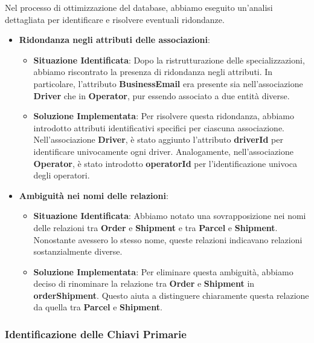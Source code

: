 Nel processo di ottimizzazione del database, abbiamo eseguito un'analisi dettagliata per identificare e risolvere eventuali ridondanze.

\begin{itemize}[leftmargin=*,label={\textbullet},itemsep=0pt,topsep=0pt,partopsep=0pt]
  \item \textbf{Ridondanza negli attributi delle associazioni}:
        \begin{itemize}[leftmargin=*,label={\textbullet},itemsep=0pt,topsep=0pt,partopsep=0pt]
          \item \textbf{Situazione Identificata}: Dopo la ristrutturazione delle specializzazioni, abbiamo riscontrato la presenza di ridondanza negli attributi. In particolare, l'attributo \textbf{BusinessEmail} era presente sia nell'associazione \textbf{Driver} che in \textbf{Operator}, pur essendo associato a due entità diverse.
          \item \textbf{Soluzione Implementata}: Per risolvere questa ridondanza, abbiamo introdotto attributi identificativi specifici per ciascuna associazione. Nell'associazione \textbf{Driver}, è stato aggiunto l'attributo \textbf{driverId} per identificare univocamente ogni driver. Analogamente, nell'associazione \textbf{Operator}, è stato introdotto \textbf{operatorId} per l'identificazione univoca degli operatori.
        \end{itemize}
  \item \textbf{Ambiguità nei nomi delle relazioni}:
        \begin{itemize}[leftmargin=*,label={\textbullet},itemsep=0pt,topsep=0pt,partopsep=0pt]
          \item \textbf{Situazione Identificata}: Abbiamo notato una sovrapposizione nei nomi delle relazioni tra \textbf{Order} e \textbf{Shipment} e tra \textbf{Parcel} e \textbf{Shipment}. Nonostante avessero lo stesso nome, queste relazioni indicavano relazioni sostanzialmente diverse.
          \item \textbf{Soluzione Implementata}: Per eliminare questa ambiguità, abbiamo deciso di rinominare la relazione tra \textbf{Order} e \textbf{Shipment} in \textbf{orderShipment}. Questo aiuta a distinguere chiaramente questa relazione da quella tra \textbf{Parcel} e \textbf{Shipment}.
        \end{itemize}
\end{itemize}

\subsubsection{Identificazione delle Chiavi Primarie}

